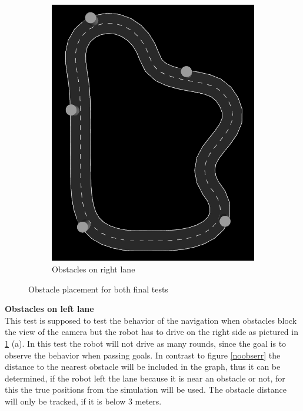 \begin{figure}
\begin{subfigure}{.5\linewidth}
		\includegraphics[width=\textwidth]{Pictures/right final obs}
		\caption{Obstacles on right lane}
	\end{subfigure}

	\caption{Obstacle placement for both final tests}
	\label{obstaclefinaltest}

\end{figure}
\textbf{Obstacles on left lane}\\
This test is supposed to test the behavior of the navigation when obstacles block the view of the camera but the robot has to drive on the right side as pictured in \ref{obstaclefinaltest} (a). In this test the robot will not drive as many rounds, since the goal is to observe the behavior when passing goals. In contrast to figure \ref{noobserr} the distance to the nearest obstacle will be included in the graph, thus it can be determined, if the robot left the lane because it is near an obstacle or not, for this the true positions from the simulation will be used. The obstacle distance will only be tracked, if it is below 3 meters.
